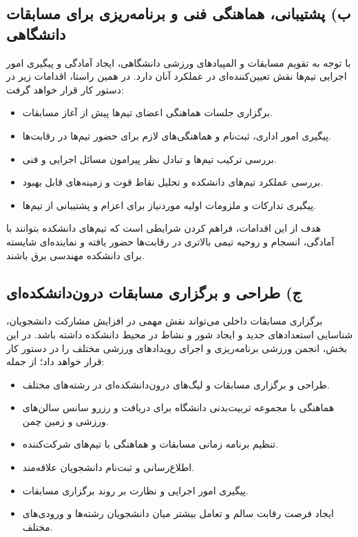 \documentclass[12pt,a4paper]{article}
\begin{document}
\subsection*{ب) پشتیبانی، هماهنگی فنی و برنامه‌ریزی برای مسابقات دانشگاهی}
با توجه به تقویم مسابقات و المپیادهای ورزشی دانشگاهی، ایجاد آمادگی و پیگیری امور اجرایی تیم‌ها نقش تعیین‌کننده‌ای در عملکرد آنان دارد. در همین راستا، اقدامات زیر در دستور کار قرار خواهد گرفت:
\begin{itemize}
    \item برگزاری جلسات هماهنگی اعضای تیم‌ها پیش از آغاز مسابقات.
    \item پیگیری امور اداری، ثبت‌نام و هماهنگی‌های لازم برای حضور تیم‌ها در رقابت‌ها.
    \item بررسی ترکیب تیم‌ها و تبادل نظر پیرامون مسائل اجرایی و فنی.
    \item بررسی عملکرد تیم‌های دانشکده و تحلیل نقاط قوت و زمینه‌های قابل بهبود.
    \item پیگیری تدارکات و ملزومات اولیه موردنیاز برای اعزام و پشتیبانی از تیم‌ها.
\end{itemize}
هدف از این اقدامات، فراهم کردن شرایطی است که تیم‌های دانشکده بتوانند با آمادگی، انسجام و روحیه تیمی بالاتری در رقابت‌ها حضور یافته و نماینده‌ای شایسته برای دانشکده مهندسی برق باشند.

\subsection*{ج) طراحی و برگزاری مسابقات درون‌دانشکده‌ای}
برگزاری مسابقات داخلی می‌تواند نقش مهمی در افزایش مشارکت دانشجویان، شناسایی استعدادهای جدید و ایجاد شور و نشاط در محیط دانشکده داشته باشد. در این بخش، انجمن ورزشی برنامه‌ریزی و اجرای رویدادهای ورزشی مختلف را در دستور کار قرار خواهد داد؛ از جمله:
\begin{itemize}
    \item طراحی و برگزاری مسابقات و لیگ‌های درون‌دانشکده‌ای در رشته‌های مختلف.
    \item هماهنگی با مجموعه تربیت‌بدنی دانشگاه برای دریافت و رزرو سانس سالن‌های ورزشی و زمین چمن.
    \item تنظیم برنامه زمانی مسابقات و هماهنگی با تیم‌های شرکت‌کننده.
    \item اطلاع‌رسانی و ثبت‌نام دانشجویان علاقه‌مند.
    \item پیگیری امور اجرایی و نظارت بر روند برگزاری مسابقات.
    \item ایجاد فرصت رقابت سالم و تعامل بیشتر میان دانشجویان رشته‌ها و ورودی‌های مختلف.
\end{itemize}
\end{document}
